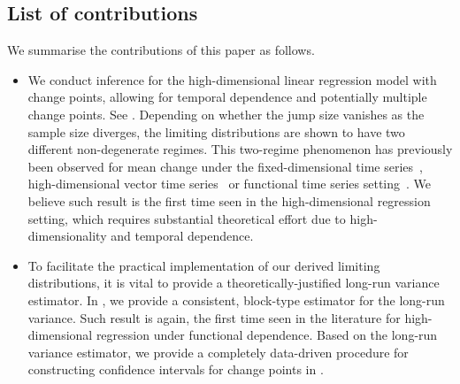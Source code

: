 \documentclass[11pt]{article}
\theoremstyle{plain}
\theoremstyle{definition}
\begin{document}
\subsection{List of contributions}
We summarise the contributions of this paper as follows.
\begin{itemize}
    \item We conduct inference for the high-dimensional linear regression model with change points, allowing for temporal dependence and potentially multiple change points. See . Depending on whether the jump size vanishes as the sample size diverges, the limiting distributions are shown to have two different non-degenerate regimes. This two-regime phenomenon has previously been observed for mean change under the fixed-dimensional time series~\citep[e.g.][]{yao1987approximating,yao1989least,bai1994}, high-dimensional vector time series~\citep[e.g.][]{kaul2021inference} or functional time series setting~\citep[e.g.][]{aue2009estimation}. We believe such result is the first time seen in the high-dimensional regression setting, which requires substantial theoretical effort due to high-dimensionality and temporal dependence.
    
    \item To facilitate the practical implementation of our derived limiting distributions, it is vital to provide a theoretically-justified long-run variance estimator. In , we provide a consistent, block-type estimator for the long-run variance.  Such result is again, the first time seen in the literature for high-dimensional regression under functional dependence.  Based on the long-run variance estimator, we provide a completely data-driven procedure for constructing confidence intervals for change points in .
    

\end{itemize}
\end{document}
